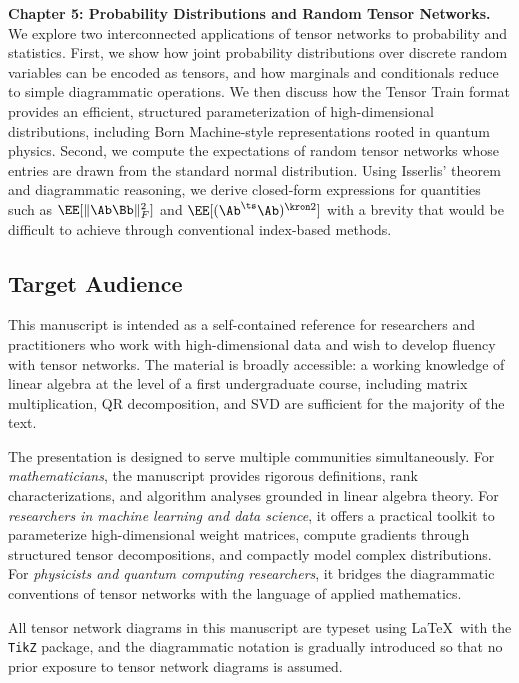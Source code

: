 \medskip
\noindent\textbf{Chapter 5: Probability Distributions and Random Tensor Networks.}
We explore two interconnected applications of tensor networks to probability and 
statistics. First, we show how joint probability distributions over discrete random 
variables can be encoded as tensors, and how marginals and conditionals reduce to simple 
diagrammatic operations. We then discuss how the Tensor Train format provides an 
efficient, structured parameterization of high-dimensional distributions, including 
Born Machine-style representations rooted in quantum physics. Second, we compute 
the expectations of random tensor networks whose entries are drawn from the standard normal 
distribution. Using Isserlis' theorem and diagrammatic reasoning, we derive closed-form 
expressions for quantities such as $\EE[\|\Ab\Bb\|_F^2]$ and 
$\EE[(\Ab^\ts \Ab)^{\kron 2}]$ with a brevity that would be difficult to achieve through conventional index-based methods.

\bigskip
\subsection*{Target Audience}

This manuscript is intended as a self-contained reference for researchers and 
practitioners who work with high-dimensional data and wish to develop fluency with tensor 
networks. The material is broadly accessible: a working knowledge of linear algebra 
at the level of a first undergraduate course, including matrix multiplication, 
QR decomposition, and SVD are sufficient for the majority of the text.

The presentation is designed to serve multiple communities simultaneously. For 
\textit{mathematicians}, the manuscript provides rigorous 
definitions, rank characterizations, and algorithm analyses grounded in linear algebra 
theory. For \textit{researchers in machine learning and data science}, it offers a practical 
toolkit to parameterize high-dimensional weight matrices, compute gradients through 
structured tensor decompositions, and compactly model complex distributions. For 
\textit{physicists and quantum computing researchers}, it bridges the diagrammatic 
conventions of tensor networks with the language of applied mathematics. 

All tensor network diagrams in this manuscript are typeset using \LaTeX\ with the \texttt{TikZ} 
package, and the diagrammatic notation is gradually introduced so that no prior exposure 
to tensor network diagrams is assumed.


